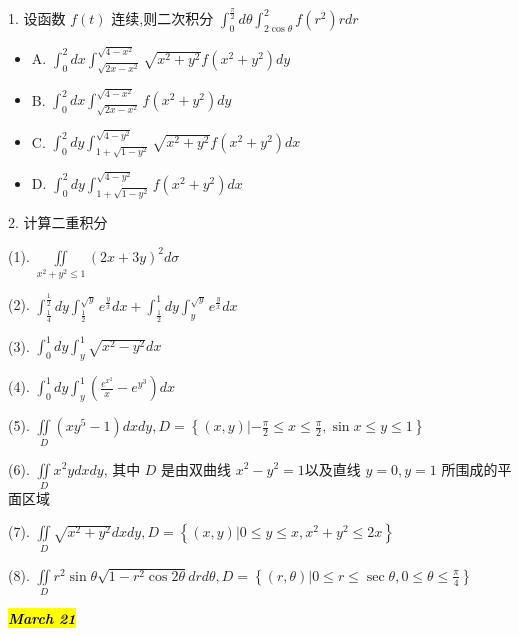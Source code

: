 1. 设函数 $f(t)$ 连续,则二次积分 $\int_{0}^{\frac{\pi}{2}}d\theta\int_{2\cos\theta}^{2}f(r^{2})rdr$
\begin{itemize}
	\item A. $\int_{0}^{2}dx\int_{\sqrt{2x-x^{2}}}^{\sqrt{4-x^{2}}}\sqrt{x^{2}+y^{2}}f(x^{2}+y^{2})dy$
	\item B. $\int_{0}^{2}dx\int_{\sqrt{2x-x^{2}}}^{\sqrt{4-x^{2}}}f(x^{2}+y^{2})dy$
	\item C. $\int_{0}^{2}dy\int_{1+\sqrt{1-y^{2}}}^{\sqrt{4-y^{2}}}\sqrt{x^{2}+y^{2}}f(x^{2}+y^{2})dx$
	\item D. $\int_{0}^{2}dy\int_{1+\sqrt{1-y^{2}}}^{\sqrt{4-y^{2}}}f(x^{2}+y^{2})dx$
\end{itemize}

2. 计算二重积分

(1). $\iint\limits_{x^{2}+y^{2}\leq 1}(2x+3y)^{2}d\sigma$

(2). $\int_{\frac{1}{4}}^{\frac{1}{2}}dy\int_{\frac{1}{2}}^{\sqrt{y}}e^{\frac{y}{x}}dx+\int_{\frac{1}{2}}^{1}dy\int_{y}^{\sqrt{y}}e^{\frac{y}{x}}dx$

(3). $\int_{0}^{1}dy\int_{y}^{1}\sqrt{x^{2}-y^{2}}dx$

(4). $\int_{0}^{1}dy\int_{y}^{1}\left(\frac{e^{x^{2}}}{x}-e^{y^{3}}\right)dx$

(5). $\iint\limits_{D}\left(xy^{5}-1\right)dxdy,D=\left\{(x,y)|-\frac{\pi}{2}\leq x \leq \frac{\pi}{2},\sin x\leq y \leq 1 \right\}$

(6). $\iint\limits_{D}x^{2}ydxdy$, 其中 $D$ 是由双曲线 $x^{2}-y^{2}=1$以及直线 $y=0,y=1$ 所围成的平面区域

(7). $\iint\limits_{D}\sqrt{x^{2}+y^{2}}dxdy,D=\left\{(x,y)|0\leq y \leq x, x^{2}+y^{2}\leq 2x\right\}$

(8). $\iint\limits_{D}r^{2}\sin\theta\sqrt{1-r^{2}\cos 2\theta}drd\theta,D=\left\{(r,\theta)|0\leq r\leq \sec\theta,0\leq \theta \leq \frac{\pi}{4}\right\}$


\hl{\textbf{\textit{March 21}}}

